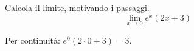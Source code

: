 
\begin{esercizio}
Calcola il limite, motivando i passaggi.
\[
        \lim_{x\to 0} e^x(2x+3)
    \]
\end{esercizio}

\begin{soluzione}
Per continuità: $e^0(2\cdot0+3)=3$.
\end{soluzione}
